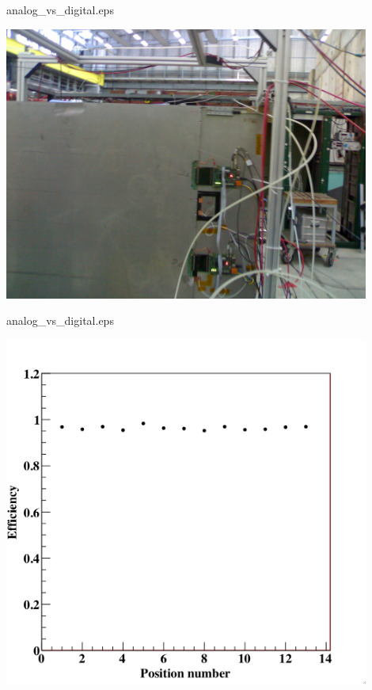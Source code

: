 \begin{frame}{analog\_vs\_digital.eps}
  \centerline{\includegraphics[width=0.9\textwidth]{images/Test1m2Photo}}
\end{frame}
\begin{frame}{analog\_vs\_digital.eps}
  \centerline{\includegraphics[width=0.9\textwidth]{images/Test1m2Efficiency}}
\end{frame}
